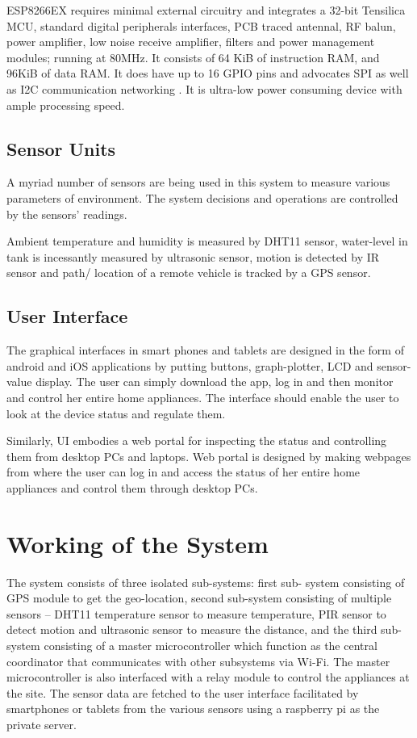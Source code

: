 \documentclass[journal,twoside]{IEEEtran}
\begin{document}
ESP8266EX requires minimal external circuitry and
integrates a 32-bit Tensilica MCU, standard digital peripherals
interfaces, PCB traced antennal, RF balun, power amplifier, low
noise receive amplifier, filters and power management modules;
running at 80MHz. It consists of 64 KiB of instruction RAM,
and 96KiB of data RAM. It does have up to 16 GPIO pins and
advocates SPI as well as I2C communication networking \cite{Espressif2016}. It
is ultra-low power consuming device with ample processing
speed.

\subsection{Sensor Units}
A myriad number of sensors are being used in this system to
measure various parameters of environment. The system
decisions and operations are controlled by the sensors’ readings.

Ambient temperature and humidity is measured by DHT11
sensor, water-level in tank is incessantly measured by ultrasonic
sensor, motion is detected by IR sensor and path/ location of a
remote vehicle is tracked by a GPS sensor.

\subsection{User Interface}
The graphical interfaces in smart phones and tablets are
designed in the form of android and iOS applications by putting
buttons, graph-plotter, LCD and sensor-value display. The user
can simply download the app, log in and then monitor and
control her entire home appliances. The interface should enable
the user to look at the device status and regulate them.

Similarly, UI embodies a web portal for inspecting the status
and controlling them from desktop PCs and laptops. Web portal
is designed by making webpages from where the user can log in
and access the status of her entire home appliances and control
them through desktop PCs.

\section{Working of the System}

The system consists of three isolated sub-systems: first sub-
system consisting of GPS module to get the geo-location, second
sub-system consisting of multiple sensors – DHT11 temperature
sensor to measure temperature, PIR sensor to detect motion and
ultrasonic sensor to measure the distance, and the third sub-
system consisting of a master microcontroller which function as
the central coordinator that communicates with other subsystems
via Wi-Fi. The master microcontroller is also interfaced with a
relay module to control the appliances at the site. The sensor data
are fetched to the user interface facilitated by smartphones or
tablets from the various sensors using a raspberry pi as the
private server.
\end{document}

